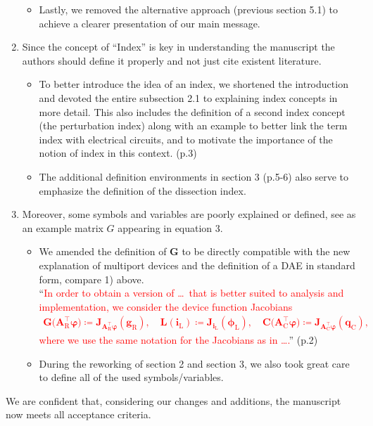 \documentclass[a4paper, 10pt,
    ]{article}
\newcommand{\mb}[1]{\mathbf{#1}}
\newcommand{\mr}[1]{\mathrm{#1}}
\newcommand{\T}{{\!\top}}
\newcommand{\AT}[1]{\mb{A}_\mr{#1}^{\T}}
\newcommand{\qC}{\mb{q}_\mr{C}}
\newcommand{\gR}{\mb{g}_\mr{R}}
\newcommand{\phiL}{\boldsymbol{\phi}_\mr{L}}
\newcommand{\vphi}{\boldsymbol{\varphi}}
\renewcommand{\i}[1]{\mb{i}_\mr{#1}}
\begin{document}
\begin{enumerate}
\begin{itemize}
            \item Lastly, we removed the alternative approach (previous section 5.1) to achieve a clearer presentation of our main message.
        \end{itemize}

        \item \textcolor{TUDa-0c}{Since the concept of ``Index'' is key in understanding the manuscript the authors should define it properly and not just cite existent literature.}
        \begin{itemize}
            \item To better introduce the idea of an index, we shortened the introduction and devoted the entire subsection 2.1 to explaining index concepts in more detail. This also includes the definition of a second index concept (the perturbation index) along with an example to better link the term index with electrical circuits, and to motivate the importance of the notion of index in this context. (p.3)
            \item The additional definition environments in section 3 (p.5-6) also serve to emphasize the definition of the dissection index.
        \end{itemize}

        \item \textcolor{TUDa-0c}{Moreover, some symbols and variables are poorly explained or defined, see as an example matrix $G$ appearing in equation 3.}
        \begin{itemize}
            \item We amended the definition of $\mb{G}$ to be directly compatible with the new explanation of multiport devices and the definition of a DAE in standard form, compare 1) above.\\
            ``\textcolor{red}{In order to obtain a version of \dots\ that is better suited to analysis and implementation, we consider the device function Jacobians
            \begin{align}
                \mb{G} \big( \AT{R} \vphi \big) \coloneqq \mb{J}_{\AT{R} \vphi}(\gR), \quad \mb{L}(\i{L}) \coloneqq \mb{J}_{\i{L}}(\phiL), \quad \mb{C} \big( \AT{C} \vphi \big) \coloneqq \mb{J}_{\AT{C} \vphi}(\qC),
            \end{align}
            where we use the same notation for the Jacobians as in \dots.}'' (p.2)
            \item During the reworking of section 2 and section 3, we also took great care to define all of the used symbols/variables.
        \end{itemize}
    \end{enumerate}

    We are confident that, considering our changes and additions, the manuscript now meets all acceptance criteria.
\end{document}
